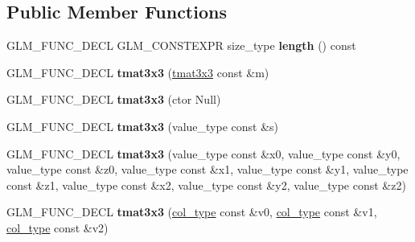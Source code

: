 \subsection*{Public Member Functions}
\begin{DoxyCompactItemize}
\item 
\hypertarget{structglm_1_1detail_1_1tmat3x3_ad8613fcc853b72629c4692825f8c9fb7}{}G\+L\+M\+\_\+\+F\+U\+N\+C\+\_\+\+D\+E\+C\+L G\+L\+M\+\_\+\+C\+O\+N\+S\+T\+E\+X\+P\+R size\+\_\+type {\bfseries length} () const \label{structglm_1_1detail_1_1tmat3x3_ad8613fcc853b72629c4692825f8c9fb7}

\item 
\hypertarget{structglm_1_1detail_1_1tmat3x3_a45e1e8d593c006b63ac0f34f936217f0}{}G\+L\+M\+\_\+\+F\+U\+N\+C\+\_\+\+D\+E\+C\+L {\bfseries tmat3x3} (\hyperlink{structglm_1_1detail_1_1tmat3x3}{tmat3x3} const \&m)\label{structglm_1_1detail_1_1tmat3x3_a45e1e8d593c006b63ac0f34f936217f0}

\item 
\hypertarget{structglm_1_1detail_1_1tmat3x3_a74e9eee7da731f5a47e2464b770c3cf3}{}G\+L\+M\+\_\+\+F\+U\+N\+C\+\_\+\+D\+E\+C\+L {\bfseries tmat3x3} (ctor Null)\label{structglm_1_1detail_1_1tmat3x3_a74e9eee7da731f5a47e2464b770c3cf3}

\item 
\hypertarget{structglm_1_1detail_1_1tmat3x3_a27a2d202aab2cbdec7a5a0df54f4e081}{}G\+L\+M\+\_\+\+F\+U\+N\+C\+\_\+\+D\+E\+C\+L {\bfseries tmat3x3} (value\+\_\+type const \&s)\label{structglm_1_1detail_1_1tmat3x3_a27a2d202aab2cbdec7a5a0df54f4e081}

\item 
\hypertarget{structglm_1_1detail_1_1tmat3x3_ac695982e33626e8671900c4b4216afca}{}G\+L\+M\+\_\+\+F\+U\+N\+C\+\_\+\+D\+E\+C\+L {\bfseries tmat3x3} (value\+\_\+type const \&x0, value\+\_\+type const \&y0, value\+\_\+type const \&z0, value\+\_\+type const \&x1, value\+\_\+type const \&y1, value\+\_\+type const \&z1, value\+\_\+type const \&x2, value\+\_\+type const \&y2, value\+\_\+type const \&z2)\label{structglm_1_1detail_1_1tmat3x3_ac695982e33626e8671900c4b4216afca}

\item 
\hypertarget{structglm_1_1detail_1_1tmat3x3_a3dfee69976020a22913dd7045ff8577b}{}G\+L\+M\+\_\+\+F\+U\+N\+C\+\_\+\+D\+E\+C\+L {\bfseries tmat3x3} (\hyperlink{structglm_1_1detail_1_1tvec3}{col\+\_\+type} const \&v0, \hyperlink{structglm_1_1detail_1_1tvec3}{col\+\_\+type} const \&v1, \hyperlink{structglm_1_1detail_1_1tvec3}{col\+\_\+type} const \&v2)\label{structglm_1_1detail_1_1tmat3x3_a3dfee69976020a22913dd7045ff8577b}


\end{DoxyCompactItemize}
